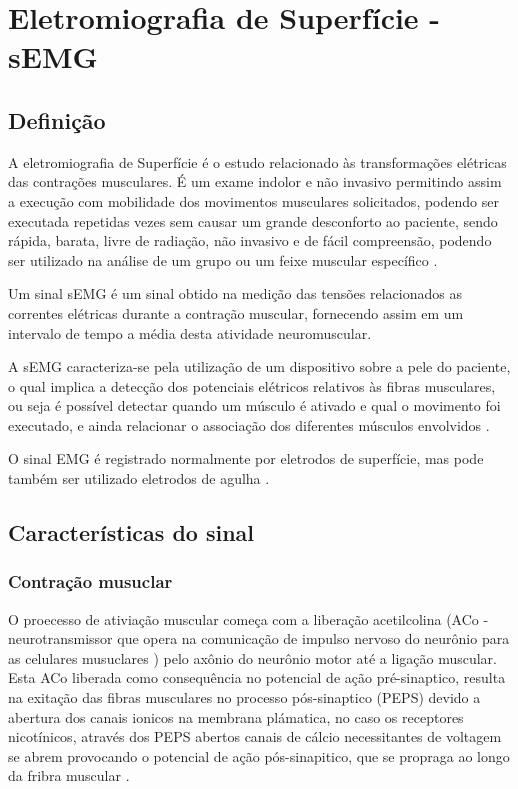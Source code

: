 \chapter{Eletromiografia de Superfície - sEMG}
\section{Definição}
A eletromiografia de Superfície é o estudo relacionado às transformações elétricas das contrações musculares. É um exame indolor e não invasivo permitindo assim a execução com mobilidade dos movimentos musculares solicitados, podendo ser executada repetidas vezes sem causar um grande desconforto ao paciente, sendo rápida, barata, livre de radiação, não invasivo e de fácil compreensão, podendo ser utilizado na análise de um grupo ou um feixe muscular específico \cite{de2010eletromiografia}.

Um sinal sEMG é um sinal obtido na medição das tensões relacionados as correntes elétricas durante a contração muscular, fornecendo assim em um intervalo de tempo a média desta atividade neuromuscular\cite{reaz2006techniques}.

A sEMG caracteriza-se pela utilização de um dispositivo sobre a pele do paciente, o qual implica a detecção dos potenciais elétricos relativos às fibras musculares, ou seja é possível detectar quando um músculo é ativado e qual o movimento foi executado, e ainda relacionar o associação dos diferentes músculos envolvidos \cite{botelho2010avaliaccao}.

O sinal EMG é registrado normalmente por eletrodos de superfície, mas pode também ser utilizado eletrodos de agulha \cite{eftaxias2015detection}.

\section{Características do sinal}

\subsection{Contração musuclar}
O proecesso de ativiação muscular começa com a liberação acetilcolina (ACo - neurotransmissor que opera na comunicação de impulso nervoso do neurônio para as celulares musuclares \cite{flores2005estructura}) pelo axônio do neurônio motor até a ligação muscular. Esta ACo liberada como consequência no potencial de ação pré-sinaptico, resulta na exitação das fibras musculares no processo pós-sinaptico (PEPS) devido a abertura dos canais ionicos na membrana plámatica, no caso os receptores nicotínicos, através dos PEPS abertos canais de cálcio necessitantes de voltagem se abrem provocando o potencial de ação pós-sinapitico, que se propraga ao longo da fribra muscular \cite{da2005detecccao}.

